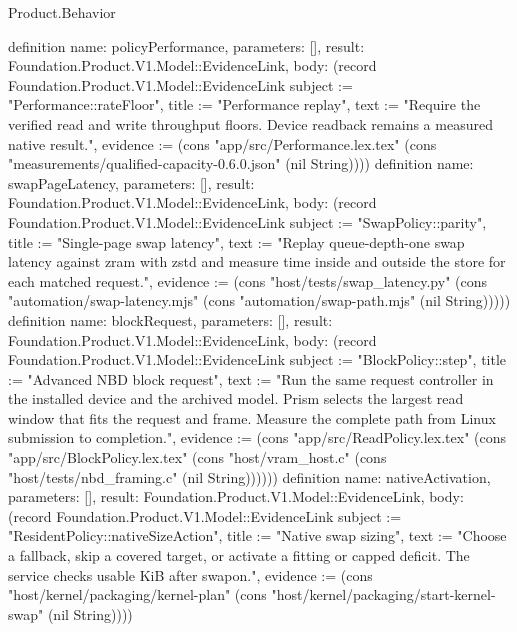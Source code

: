 \begin{lexlean}{Product.Behavior}
\begin{semanticmodule}
definition{
  name: policyPerformance, parameters: [], result: Foundation.Product.V1.Model::EvidenceLink,
  body: (record Foundation.Product.V1.Model::EvidenceLink {subject := "Performance::rateFloor", title := "Performance replay", text := "Require the verified read and write throughput floors. Device readback remains a measured native result.", evidence := (cons "app/src/Performance.lex.tex" (cons "measurements/qualified-capacity-0.6.0.json" (nil String)))})
}
definition{
  name: swapPageLatency, parameters: [], result: Foundation.Product.V1.Model::EvidenceLink,
  body: (record Foundation.Product.V1.Model::EvidenceLink {subject := "SwapPolicy::parity", title := "Single-page swap latency", text := "Replay queue-depth-one swap latency against zram with zstd and measure time inside and outside the store for each matched request.", evidence := (cons "host/tests/swap_latency.py" (cons "automation/swap-latency.mjs" (cons "automation/swap-path.mjs" (nil String))))})
}
definition{
  name: blockRequest, parameters: [], result: Foundation.Product.V1.Model::EvidenceLink,
  body: (record Foundation.Product.V1.Model::EvidenceLink {subject := "BlockPolicy::step", title := "Advanced NBD block request", text := "Run the same request controller in the installed device and the archived model. Prism selects the largest read window that fits the request and frame. Measure the complete path from Linux submission to completion.", evidence := (cons "app/src/ReadPolicy.lex.tex" (cons "app/src/BlockPolicy.lex.tex" (cons "host/vram_host.c" (cons "host/tests/nbd_framing.c" (nil String)))))})
}
definition{
  name: nativeActivation, parameters: [], result: Foundation.Product.V1.Model::EvidenceLink,
  body: (record Foundation.Product.V1.Model::EvidenceLink {subject := "ResidentPolicy::nativeSizeAction", title := "Native swap sizing", text := "Choose a fallback, skip a covered target, or activate a fitting or capped deficit. The service checks usable KiB after swapon.", evidence := (cons "host/kernel/packaging/kernel-plan" (cons "host/kernel/packaging/start-kernel-swap" (nil String)))})
}
\end{semanticmodule}
\end{lexlean}
